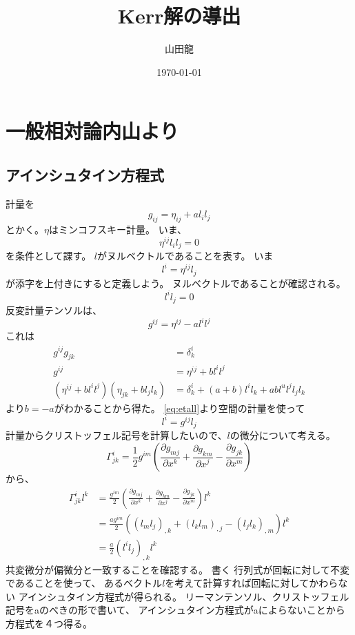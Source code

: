 \documentclass[twocolumn]{jsarticle}
\date{\today}
\author{山田龍}
\title{Kerr解の導出}
\newcommand{\pder}[2][]{\frac{\partial#1}{\partial#2}}
\newcommand{\pderx}[2][]{\pder[#1]{x^{#2}}}
\newcommand{\pdergx}[2][]{\pderx[g_{#1}]{#2}}
\newcommand{\half}{\frac{1}{2}}
\newcommand{\beq}{\begin{equation}}
\newcommand{\eeq}{\end{equation}}
\newcommand{\GaT}[3]{\Gamma^{#1}_{#2 #3}}
\newcommand{\Christfinside}[3]{\pdergx[#3 #1]{#2} + \pdergx[#2 #3]{#1} - \pdergx[#1 #2]{#3}}
\newcommand{\Christf}[4]{\Gamma^{#1}_{#2 #3}=\half g^{#1 #4}(\Christfinside{#2}{#3}{#4})}
\begin{document}
\maketitle
\section{一般相対論内山より}
\subsection{アインシュタイン方程式}
計量を
\beq
g_{ij} = \eta_{ij} + al_il_j
\eeq
とかく。$\eta$はミンコフスキー計量。
いま、
\beq\label{eq:etall}
    \eta^{ij} l_il_j = 0
\eeq
を条件として課す。
$l$がヌルベクトルであることを表す。
いま
\beq
l^i = \eta^{ij}l_j
\eeq
が添字を上付きにすると定義しよう。
ヌルベクトルであることが確認される。
\beq
    l^il_j = 0
\eeq
反変計量テンソルは、
\beq
g^{ij} = \eta^{ij} - al^il^j
\eeq
これは
\begin{align}
    g^{ij}g_{jk} &= \delta^i_k\\
    g^{ij} &= \eta^{ij} + bl^il^j\\
    (\eta^{ij} + bl^il^j)(\eta_{jk} + bl_jl_k) &= \delta^i_k + (a + b)l^il_k + abl^ul^jl_jl_k
\end{align}
より$b = -a$がわかることから得た。
\eqref{eq:etall}より空間の計量を使って
\beq
 l^i = g^{ij}l_j 
\eeq
計量からクリストッフェル記号を計算したいので、$l$の微分について考える。
\beq
\Christf{i}{j}{k}{m}
\eeq
から、
\begin{align}
    \GaT{i}{j}{k}l^k &= \frac{g^{im}}{2}(\Christfinside{j}{k}{m})l^k\\
                     &= \frac{ag^{im}}{2}((l_ml_j)_{,k} + (l_kl_m)_{,j} - (l_jl_k)_{,m})l^k\\
                     &= \frac{a}{2}(l^il_j)_{,k}l^k
\end{align}
共変微分が偏微分と一致することを確認する。
書く
行列式が回転に対して不変であることを使って、
あるベクトル$l$を考えて計算すれば回転に対してかわらない
アインシュタイン方程式が得られる。
リーマンテンソル、クリストッフェル記号をaのべきの形で書いて、
アインシュタイン方程式がaによらないことから方程式を４つ得る。
\end{document}
